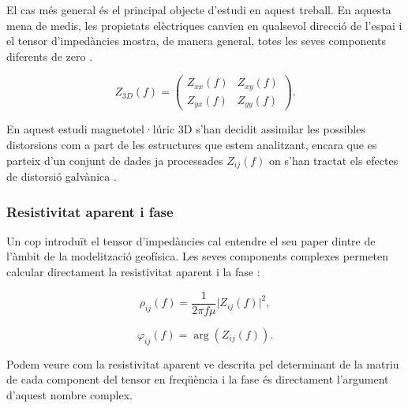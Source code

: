 \documentclass[11pt,a4paper,oneside]{article}
\begin{document}
\vspace{5pt}

El cas més general és el principal objecte d’estudi en aquest treball. En aquesta mena de medis, les propietats elèctriques canvien en qualsevol direcció de l'espai i el tensor d'impedàncies mostra, de manera general, totes les seves components diferents de zero \citep{weaver2000,marti2004}. 
\vspace{5pt}

\begin{equation}
    Z_{3D}(f) = \begin{pmatrix} Z_{xx}(f) & Z_{xy}(f) \\ Z_{yx}(f) & Z_{yy}(f) \end{pmatrix}.
    \label{eq:11}
\end{equation}

\vspace{5pt}


En aquest estudi magnetotel·lúric 3D s'han decidit assimilar les possibles distorsions com a part de les estructures que estem analitzant, encara que es parteix d'un conjunt de dades ja processades $Z_{ij}(f)$ on s'han tractat els efectes de distorsió galvànica \citet{arango2005}.



\subsubsection{Resistivitat aparent i fase}


Un cop introduït el tensor d’impedàncies cal entendre el seu paper dintre de l’àmbit de la modelització geofísica. Les seves components complexes permeten calcular directament la resistivitat aparent i la fase \citep{chavejones2012}:
\vspace{5pt}

\begin{equation}
    \rho_{ij}(f) = \frac{1}{2\pi f \mu} \vert Z_{ij}(f) \vert^2,
    \label{eq:13}
\end{equation}


\begin{equation}
    \varphi_{ij}(f) = \arg(Z_{ij}(f)).
    \label{eq:14}
\end{equation}

\vspace{5pt}

Podem veure com la resistivitat aparent ve descrita pel determinant de la matriu de cada component del tensor en freqüència i la fase és directament l'argument d'aquest nombre complex. 
\end{document}
